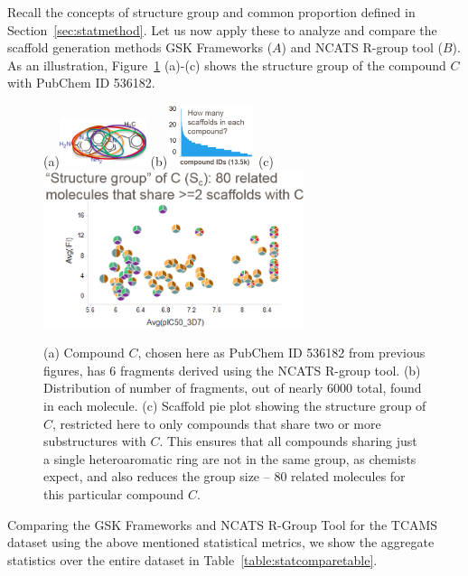 \documentclass[journal=jacsat,manuscript=article]{achemso}
\newcommand*\fref[1]{Figure~\ref{fig:#1}}
\newcommand*\tref[1]{Table~\ref{table:#1}}
\newcommand*\sref[1]{Section~\ref{sec:#1}}
\begin{document}
Recall the concepts of structure group and common proportion defined in \sref{statmethod}.  Let us now apply these to analyze and compare the scaffold generation methods GSK Frameworks ($A$) and NCATS R-group tool ($B$). As an illustration, \fref{strucgroup} (a)-(c) shows the structure group of the compound $C$ with PubChem ID 536182. 
\begin{figure}
  (a)\includegraphics[width=1in]{fig/mol_6scaf.png}
  (b)\includegraphics[width=1in]{fig/howmany_scaf.png}
  (c) \includegraphics[width=3in]{fig/structure_group_C.png}
  \caption{(a) Compound $C$, chosen here as PubChem ID 536182 from previous figures, has 6 fragments derived using the NCATS R-group tool. (b) Distribution of number of fragments, out of nearly 6000 total, found in each molecule. (c) Scaffold pie plot showing the structure group of $C$, restricted here to only compounds that share two or more substructures with $C$. This ensures that all compounds sharing just a single heteroaromatic ring are not in the same group, as chemists expect, and also reduces the group size -- 80 related molecules for this particular compound $C$.}
    \label{fig:strucgroup}
\end{figure}


Comparing the GSK Frameworks and NCATS R-Group Tool for the TCAMS dataset using the above mentioned statistical metrics, we show the aggregate statistics over the entire dataset in \tref{statcomparetable}.
\end{document}
